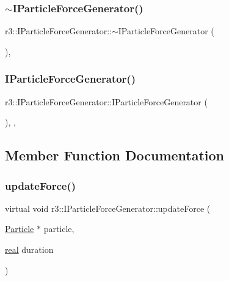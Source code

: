 \subsubsection{\texorpdfstring{$\sim$\+I\+Particle\+Force\+Generator()}{~IParticleForceGenerator()}}
{\footnotesize\ttfamily r3\+::\+I\+Particle\+Force\+Generator\+::$\sim$\+I\+Particle\+Force\+Generator (\begin{DoxyParamCaption}{ }\end{DoxyParamCaption})\hspace{0.3cm}{\ttfamily [virtual]}, {\ttfamily [default]}}

\mbox{\label{classr3_1_1_i_particle_force_generator_a919ae235883c736232741d947fd9a708}} 
\subsubsection{\texorpdfstring{I\+Particle\+Force\+Generator()}{IParticleForceGenerator()}}
{\footnotesize\ttfamily r3\+::\+I\+Particle\+Force\+Generator\+::\+I\+Particle\+Force\+Generator (\begin{DoxyParamCaption}{ }\end{DoxyParamCaption})\hspace{0.3cm}{\ttfamily [explicit]}, {\ttfamily [protected]}, {\ttfamily [default]}}



\subsection{Member Function Documentation}
\mbox{\label{classr3_1_1_i_particle_force_generator_a8b692fc3a40f815dc44c106b451c3a90}} 
\subsubsection{\texorpdfstring{update\+Force()}{updateForce()}}
{\footnotesize\ttfamily virtual void r3\+::\+I\+Particle\+Force\+Generator\+::update\+Force (\begin{DoxyParamCaption}\item[{\mbox{\hyperlink{classr3_1_1_particle}{Particle}} $\ast$}]{particle,  }\item[{\mbox{\hyperlink{namespacer3_ab2016b3e3f743fb735afce242f0dc1eb}{real}}}]{duration }\end{DoxyParamCaption})\hspace{0.3cm}{\ttfamily [pure virtual]}}




